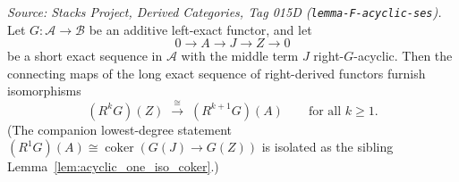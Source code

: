 \begin{lemma}\leanok
  \label{lem:acyclic_dimension_shift}
  \textit{Source: Stacks Project, Derived Categories, Tag 015D
  (\texttt{lemma-F-acyclic-ses}).}
  Let \(G : \mathcal{A} \to \mathcal{B}\) be an additive left-exact functor, and let
  \[
    0 \longrightarrow A \longrightarrow J \longrightarrow Z \longrightarrow 0
  \]
  be a short exact sequence in \(\mathcal{A}\) with the middle term \(J\)
  right-\(G\)-acyclic. Then the connecting maps of the long exact sequence of
  right-derived functors furnish isomorphisms
  \[
    (R^{k} G)(Z) \;\xrightarrow{\ \cong\ }\; (R^{k+1} G)(A)
    \qquad \text{for all } k \geq 1.
  \]
  (The companion lowest-degree statement
  \((R^{1} G)(A) \cong \operatorname{coker}(G(J) \to G(Z))\) is isolated as the
  sibling Lemma~\ref{lem:acyclic_one_iso_coker}.)
\end{lemma}

